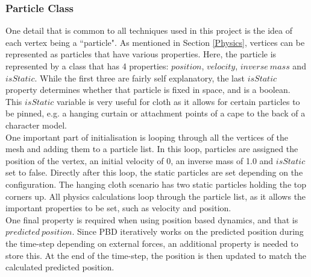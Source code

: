 \documentclass[12pt,a4paper]{article}
\begin{document}
\subsubsection{Particle Class}
One detail that is common to all techniques used in this project is the idea of each vertex being a ``particle". As mentioned in Section \ref{Physics}, vertices can be represented as particles that have various properties. Here, the particle is represented by a class that has 4 properties: $position$, $velocity$, $inverse\ mass$ and $isStatic$. While the first three are fairly self explanatory, the last $isStatic$ property determines whether that particle is fixed in space, and is a boolean. This $isStatic$ variable is very useful for cloth as it allows for certain particles to be pinned, e.g. a hanging curtain or attachment points of a cape to the back of a character model. \\

One important part of initialisation is looping through all the vertices of the mesh and adding them to a particle list. In this loop, particles are assigned the position of the vertex, an initial velocity of 0, an inverse mass of 1.0 and $isStatic$ set to false. Directly after this loop, the static particles are set depending on the configuration. The hanging cloth scenario has two static particles holding the top corners up. All physics calculations loop through the particle list, as it allows the important properties to be set, such as velocity and position.
\\

One final property is required when using position based dynamics, and that is $predicted\ position$. Since PBD iteratively works on the predicted position during the time-step depending on external forces, an additional property is needed to store this. At the end of the time-step, the position is then updated to match the calculated predicted position.
\end{document}
